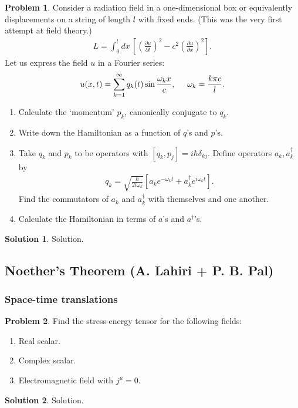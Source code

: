 \documentclass[a4paper,11pt]{article}
\numberwithin{equation}{section}
\theoremstyle{definition}
\newtheorem{prob}{Problem}[section]
\newtheorem{sln}{Solution}[section]
\newcommand{\p}{\partial}
\begin{document}
\begin{prob}
	Consider a radiation field in a one-dimensional box or equivalently displacements on a string of length $l$ with fixed ends. (This was the very first attempt at field theory.)
	\begin{align}
	L = \int^l_0 dx\, \left[\left(\frac{\p u}{\p t}\right)^2 - c^2\left(\frac{\p u}{\p x}\right)^2\right].
	\end{align}
	Let us express the field $u$ in a Fourier series:
	\begin{align}
	u(x,t) = \sum^\infty_{k=1}q_k(t)\sin\frac{\omega_k x}{c},\hspace{0.5cm} \omega_k = \frac{k\pi c}{l}.
	\end{align}
	\begin{enumerate}
		\item Calculate the `momentum' $p_k$, canonically conjugate to $q_k$.
		\item Write down the Hamiltonian as a function of $q$'s and $p$'s.
		\item Take $q_k$ and $p_k$ to be operators with $[q_k,p_j] = i\hbar \delta_{kj}$. Define operators $a_k, a_k^\dagger$ by
		\begin{align}
		q_k = \sqrt{\frac{\hbar}{2l\omega_k}}\left[ a_k e^{-\omega_k t} + a_k^\dagger e^{i \omega_k t} \right].
		\end{align}
		Find the commutators of $a_k$ and $a_k^\dagger$ with themselves and one another. 
		\item Calculate the Hamiltonian in terms of $a$'s and $a^\dagger$'s.
	\end{enumerate}


	\begin{sln}
		Solution.
	\end{sln}
\end{prob}









\newpage

\subsection{Noether's Theorem (A. Lahiri + P. B. Pal)}

\subsubsection{Space-time translations}
\begin{prob}
	Find the stress-energy tensor for the following fields:
	\begin{enumerate}
		\item Real scalar.
		\item Complex scalar.
		\item Electromagnetic field with $j^\mu = 0$.
	\end{enumerate}
	
	\begin{sln}
		Solution.
	\end{sln}
\end{prob}
\end{document}
